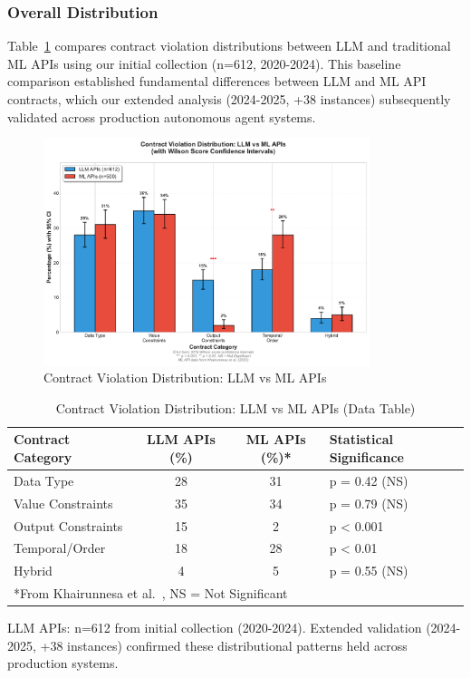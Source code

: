 \documentclass[11pt]{article}
\begin{document}
\subsubsection{Overall Distribution}

Table~\ref{tab:distribution_comparison} compares contract violation distributions between LLM and traditional ML APIs using our initial collection (n=612, 2020-2024). This baseline comparison established fundamental differences between LLM and ML API contracts, which our extended analysis (2024-2025, +38 instances) subsequently validated across production autonomous agent systems.

\begin{figure}[h]
\centering
\includegraphics[width=0.85\textwidth]{fig3_llm_vs_ml_comparison.pdf}
\caption{Contract Violation Distribution: LLM vs ML APIs}
\label{fig:distribution_comparison}
\end{figure}

\begin{table}[h]
\centering
\caption{Contract Violation Distribution: LLM vs ML APIs (Data Table)}
\label{tab:distribution_comparison}
\begin{tabular}{lccl}
\toprule
\textbf{Contract Category} & \textbf{LLM APIs (\%)} & \textbf{ML APIs (\%)*} & \textbf{Statistical Significance} \\
\midrule
Data Type & 28 & 31 & p = 0.42 (NS) \\
Value Constraints & 35 & 34 & p = 0.79 (NS) \\
Output Constraints & 15 & 2 & p < 0.001 \\
Temporal/Order & 18 & 28 & p < 0.01 \\
Hybrid & 4 & 5 & p = 0.55 (NS) \\
\bottomrule
\multicolumn{4}{l}{\small{*From Khairunnesa et al.~\cite{khairunnesa2023}, NS = Not Significant}}
\end{tabular}
\vspace{0.1cm}
\footnotesize{LLM APIs: n=612 from initial collection (2020-2024). Extended validation (2024-2025, +38 instances) confirmed these distributional patterns held across production systems.}
\end{table}
\end{document}
